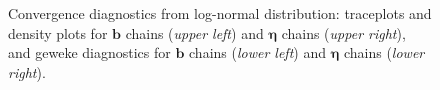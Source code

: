 \documentclass[ba]{imsart}
\numberwithin{equation}{section}
\theoremstyle{plain}
\begin{document}
\begin{figure}[H]
		\caption {Convergence diagnostics from log-normal distribution: traceplots and density plots for $\boldsymbol{b}$ chains (\textit{upper left}) and $\boldsymbol{\eta}$ chains (\textit{upper right}), and geweke diagnostics for $\boldsymbol{b}$ chains (\textit{lower left}) and $\boldsymbol{\eta}$ chains (\textit{lower right}).}
		\label{figure:convergencediag}
	\end{figure}

\begin{supplement}
\label{suppA} 
\end{supplement}




\end{document}
